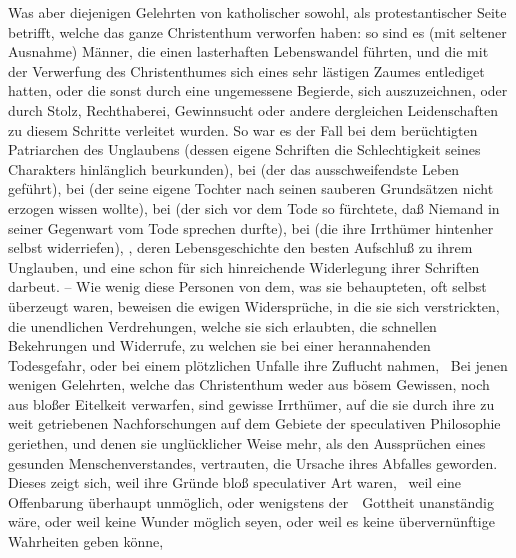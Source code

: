 \begin{aufza}
\begin{aufzb}
\item Was aber diejenigen Gelehrten von katholischer sowohl, als protestantischer Seite betrifft, welche das ganze Christenthum verworfen haben: so sind es (mit seltener Ausnahme) Männer, die einen lasterhaften Lebenswandel führten, und die mit der Verwerfung des Christenthumes sich eines sehr lästigen Zaumes entlediget hatten, oder die sonst durch eine ungemessene Begierde, sich auszuzeichnen, oder durch Stolz, Rechthaberei, Gewinnsucht oder andere dergleichen Leidenschaften zu diesem Schritte verleitet wurden. So war es der Fall bei dem berüchtigten Patriarchen des Unglaubens  (dessen eigene Schriften die Schlechtigkeit seines Charakters hinlänglich beurkunden), bei  (der das ausschweifendste Leben geführt), bei  (der seine eigene Tochter nach seinen sauberen Grundsätzen nicht erzogen wissen wollte), bei  (der sich vor dem Tode so fürchtete, daß Niemand in seiner Gegenwart vom Tode sprechen durfte), bei  (die ihre Irrthümer hintenher selbst widerriefen),  \uA , deren Lebensgeschichte den besten Aufschluß zu ihrem Unglauben, und eine schon für sich hinreichende Widerlegung ihrer Schriften darbeut. -- Wie wenig diese Personen von dem, was sie behaupteten, oft selbst überzeugt waren, beweisen die ewigen Widersprüche, in die sie sich verstrickten, die unendlichen Verdrehungen, welche sie sich erlaubten, die schnellen Bekehrungen und Widerrufe, zu welchen sie bei einer herannahenden Todesgefahr, oder bei einem plötzlichen Unfalle ihre Zuflucht nahmen, \usw\ Bei jenen wenigen Gelehrten, welche das Christenthum weder aus bösem Gewissen, noch aus bloßer Eitelkeit verwarfen, sind gewisse Irrthümer, auf die sie durch ihre zu weit getriebenen Nachforschungen auf dem Gebiete der speculativen Philosophie geriethen, und denen sie unglücklicher Weise mehr, als den Aussprüchen eines gesunden Menschenverstandes, vertrauten, die Ursache ihres Abfalles geworden. Dieses zeigt sich, weil ihre Gründe bloß speculativer Art waren, \zB\ weil eine Offenbarung überhaupt unmöglich, oder wenigstens der~\ Gottheit unanständig wäre, oder weil keine Wunder möglich seyen, oder weil es keine übervernünftige Wahrheiten geben könne, \udgl\ 

\end{aufzb}
\end{aufza}
